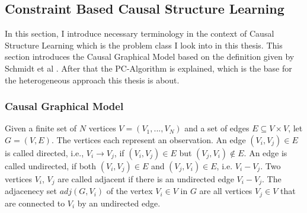 

\subsection{Constraint Based Causal Structure Learning}
In this section, I introduce necessary terminology in the context of Causal Structure Learning which is the problem class I look into in this thesis. This section introduces the Causal Graphical Model based on the definition given by Schmidt et al \cite{constraintgpu}. After that the PC-Algorithm is explained, which is the base for the heterogeneous approach this thesis is about.

\subsubsection{Causal Graphical Model}
Given a finite set of $N$ vertices $V = (V_1,...,V_N)$ and a set of edges $E \subseteq V \times V$, let $G = (V,E)$. The vertices each represent an observation. An edge $(V_i, V_j) \in E$ is called directed, i.e., $V_i \rightarrow V_j$, if $(V_i,V_j) \in E$ but $(V_j, V_i) \notin E$. An edge is called undirected, if both $(V_i,V_j) \in E$ and $(V_j, V_i) \in E$, i.e. $V_i - V_j$. Two vertices $V_i$, $V_j$ are called adjacent if there is an undirected edge $V_i - V_j$. The adjacenecy set $adj(G, V_i)$ of the vertex $V_i \in V$ in $G$ are all vertices $V_j \in V$ that are connected to $V_i$ by an undirected edge.